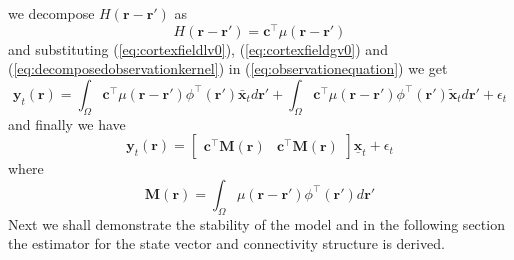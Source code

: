 \documentclass[onecolumn,draftcls]{IEEEtran}
\begin{document}
 we decompose $ H(\mathbf r-\mathbf r')$ as
 \begin{equation}
  H(\mathbf r-\mathbf r')= \mathbf c^{\top}\mu(\mathbf r-\mathbf r')
\label{eq:decomposedobservationkernel}
\end{equation}
and substituting  (\ref{eq:cortexfieldlv0}), (\ref{eq:cortexfieldgv0}) and (\ref{eq:decomposedobservationkernel}) in (\ref{eq:observationequation}) we get
\begin{equation}
 \mathbf y_t(\mathbf r)=\int_{\Omega}\mathbf c^{\top}\mu(\mathbf r-\mathbf r')\phi^{\top}(\mathbf r')\bar{\mathbf x}_{t}d\mathbf r'+\int_{\Omega}\mathbf c^{\top}\mu(\mathbf r-\mathbf r')\phi^{\top}(\mathbf r')\tilde{\mathbf x}_{t}d\mathbf r'+\epsilon_t
\end{equation}
and finally we have
\begin{equation}
\mathbf y_t(\mathbf r)= \begin{bmatrix}\mathbf c^{\top}\mathbf M(\mathbf r)&\mathbf c^{\top}\mathbf M(\mathbf r)\end{bmatrix}\underline{\mathbf x}_t+\epsilon_t
\end{equation}
where
\begin{equation}
 \mathbf M(\mathbf r)=\int_{\Omega}\mu(\mathbf r-\mathbf r')\phi^{\top}(\mathbf r')d\mathbf r'
\end{equation}
Next we shall demonstrate the stability of the model and in the following section the estimator for the state vector and connectivity structure is derived.
\end{document}
